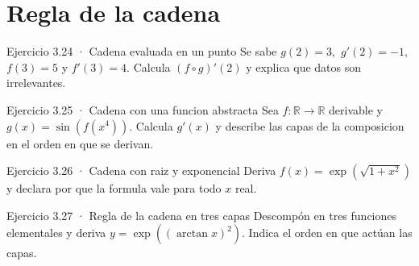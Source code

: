 \documentclass[10pt,a4paper,oneside,openany]{book}
\begin{document}
\section{Regla de la cadena}
\begin{PSevenExerciseFixed}{Ejercicio 3.24 · Cadena evaluada en un punto}
Se sabe \(g(2)=3,\) \(g'(2)=-1,\) \(f(3)=5\) y \(f'(3)=4\). Calcula \((f\circ g)'(2)\) y explica que datos son irrelevantes.
\end{PSevenExerciseFixed}
\begin{PSevenExerciseFixed}{Ejercicio 3.25 · Cadena con una funcion abstracta}
Sea \(f:\mathbb{R}\to \mathbb{R}\) derivable y \(g(x)=\sin(f(x^{4}))\). Calcula \(g'(x)\) y describe las capas de la composicion en el orden en que se derivan.
\end{PSevenExerciseFixed}
\begin{PSevenExerciseFixed}{Ejercicio 3.26 · Cadena con raiz y exponencial}
Deriva \(f(x)=\exp(\sqrt{1+x^{2}})\) y declara por que la formula vale para todo \(x\) real.
\end{PSevenExerciseFixed}
\begin{PSevenExerciseFixed}{Ejercicio 3.27 · Regla de la cadena en tres capas}
Descompón en tres funciones elementales y deriva \(y=\exp((\arctan x)^2)\). Indica el orden en que actúan las capas.
\end{PSevenExerciseFixed}
\end{document}
